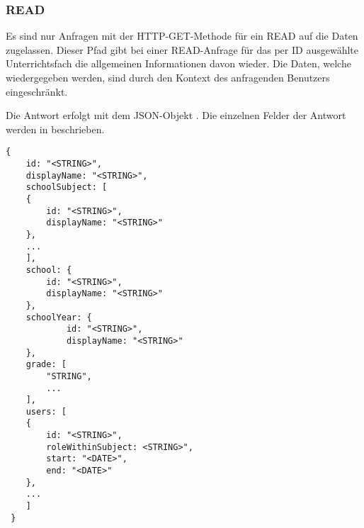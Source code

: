 \subsubsection{READ}
\label{sec:rest:api:subjects:id:read}
Es sind nur Anfragen mit der HTTP-GET-Methode für ein READ auf die Daten zugelassen.
Dieser Pfad gibt bei einer READ-Anfrage für das per ID ausgewählte Unterrichtsfach die allgemeinen Informationen davon wieder.
Die Daten, welche wiedergegeben werden, sind durch den Kontext des anfragenden Benutzers eingeschränkt.

Die Antwort erfolgt mit dem JSON-Objekt . 
Die einzelnen Felder der Antwort werden in  beschrieben.


\begin{lstlisting}[caption={JSON-Antwort für einen GET-Aufruf des Pfads /api/subjects/\$id},label={lst:code:rest:api:subjects:id:read:ret},frame=tlrb]
{
    id: "<STRING>",
    displayName: "<STRING>",
    schoolSubject: [
    {
        id: "<STRING>",
        displayName: "<STRING>"
    },
    ...
    ],
    school: {
        id: "<STRING>",
        displayName: "<STRING>"
    },
    schoolYear: {
            id: "<STRING>",
            displayName: "<STRING>"
    },
    grade: [
        "STRING",
        ...
    ],
    users: [
    {
        id: "<STRING>",
        roleWithinSubject: <STRING>",
        start: "<DATE>",
        end: "<DATE>"    
    },
    ...
    ]
 }
\end{lstlisting}

